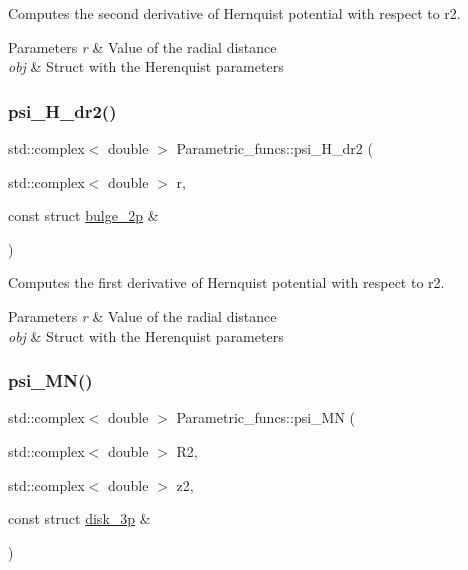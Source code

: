 Computes the second derivative of Hernquist potential with respect to r2. 


\begin{DoxyParams}{Parameters}
{\em r} & Value of the radial distance \\
\hline
{\em obj} & Struct with the Herenquist parameters \\
\hline
\end{DoxyParams}
\mbox{\label{classParametric__funcs_ab02a5302fd6db1539e4a29d430370380}} 
\subsubsection{\texorpdfstring{psi\+\_\+\+H\+\_\+dr2()}{psi\_H\_dr2()}}
{\footnotesize\ttfamily std\+::complex$<$ double $>$ Parametric\+\_\+funcs\+::psi\+\_\+\+H\+\_\+dr2 (\begin{DoxyParamCaption}\item[{std\+::complex$<$ double $>$}]{r,  }\item[{const struct \hyperlink{structbulge__2p}{bulge\+\_\+2p} \&}]{ }\end{DoxyParamCaption})\hspace{0.3cm}{\ttfamily [static]}}



Computes the first derivative of Hernquist potential with respect to r2. 


\begin{DoxyParams}{Parameters}
{\em r} & Value of the radial distance \\
\hline
{\em obj} & Struct with the Herenquist parameters \\
\hline
\end{DoxyParams}
\mbox{\label{classParametric__funcs_a63fbb6aed4d72b75e8136365805404f6}} 
\subsubsection{\texorpdfstring{psi\+\_\+\+M\+N()}{psi\_MN()}}
{\footnotesize\ttfamily std\+::complex$<$ double $>$ Parametric\+\_\+funcs\+::psi\+\_\+\+MN (\begin{DoxyParamCaption}\item[{std\+::complex$<$ double $>$}]{R2,  }\item[{std\+::complex$<$ double $>$}]{z2,  }\item[{const struct \hyperlink{structdisk__3p}{disk\+\_\+3p} \&}]{ }\end{DoxyParamCaption})\hspace{0.3cm}{\ttfamily [static]}}



